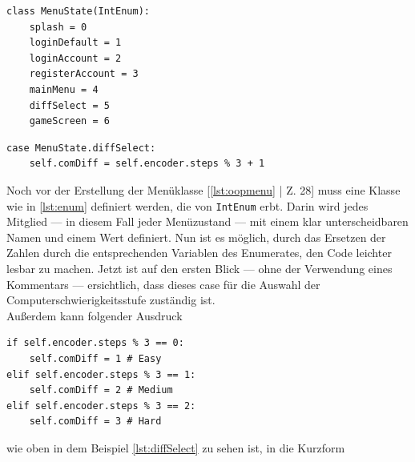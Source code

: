 \begin{minipage}[t]{0.33\textwidth}
\begin{scriptsize}
\begin{lstlisting}[captionpos=b, caption={Definition des Enumerates}, label={lst:enum}]
class MenuState(IntEnum):
    splash = 0
    loginDefault = 1
    loginAccount = 2
    registerAccount = 3
    mainMenu = 4
    diffSelect = 5
    gameScreen = 6
\end{lstlisting}
\end{scriptsize}
\end{minipage}\hfill
\begin{minipage}[t]{0.58\textwidth}
\begin{scriptsize}
\begin{lstlisting}[captionpos=b, caption={Verbesserter Code für die Auswahl der Schwierigkeitsstufe}, label={lst:diffSelect}]
case MenuState.diffSelect:
    self.comDiff = self.encoder.steps % 3 + 1
\end{lstlisting}
\end{scriptsize}
\end{minipage}

Noch vor der Erstellung der Menüklasse [\ref{lst:oopmenu} | Z. 28] muss eine Klasse wie in \ref{lst:enum} definiert 
werden, die von \verb|IntEnum| erbt. Darin wird jedes Mitglied — in diesem Fall jeder Menüzustand — mit einem klar 
unterscheidbaren Namen und einem Wert definiert. Nun ist es möglich, durch das Ersetzen der Zahlen durch die 
entsprechenden Variablen des Enumerates, den Code leichter lesbar zu machen. Jetzt ist auf den ersten Blick — ohne der 
Verwendung eines Kommentars — ersichtlich, dass dieses case für die Auswahl der Computerschwierigkeitsstufe zuständig 
ist.\\

Außerdem kann folgender Ausdruck\\

\begin{scriptsize}
\begin{lstlisting}[captionpos=b, caption={Alte Abfrage des Encoderwerts}, label={lst:altencoder}]
if self.encoder.steps % 3 == 0:
    self.comDiff = 1 # Easy
elif self.encoder.steps % 3 == 1:
    self.comDiff = 2 # Medium
elif self.encoder.steps % 3 == 2:
    self.comDiff = 3 # Hard
\end{lstlisting}
\end{scriptsize}

wie oben in dem Beispiel \ref{lst:diffSelect} zu sehen ist, in die Kurzform\\

